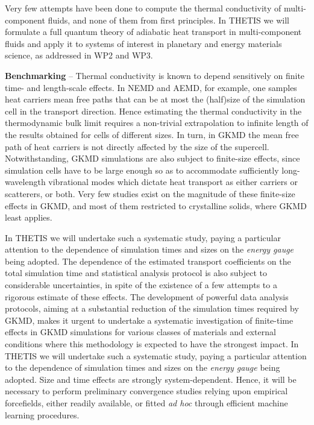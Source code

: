 Very few attempts have been done to compute the thermal conductivity of multi-component fluids,\cite{Galamba2007,Ohtori2009a,Ohtori2009b,Salanne2011,Pan2016} and none of them from first principles. In THETIS we will formulate a full quantum theory of adiabatic heat transport in multi-component fluids and apply it to systems of interest in planetary and energy materials science, as addressed in WP2 and WP3. 

\smallskip\noindent\textbf{Benchmarking} -- Thermal conductivity is known to depend sensitively on finite time- and length-scale effects. In NEMD and AEMD, for example, one samples heat carriers mean free paths that can be at most the (half)size of the simulation cell in the transport direction. Hence estimating the thermal conductivity in the thermodynamic bulk limit requires a non-trivial extrapolation to infinite length of the results obtained for cells of different sizes.\cite{sellan2010,Zaoui2016,Wang2017} In turn, in GKMD the mean free path of heat carriers is not directly affected by the size of the supercell. Notwithstanding, GKMD simulations are also subject to  finite-size effects, since simulation cells have to be large enough so as to accommodate sufficiently long-wavelength vibrational modes which dictate heat transport as either carriers or scatterers, or both. Very few studies exist on the magnitude of these finite-size effects in GKMD,\cite{sellan2010,He2011,Pereira:2013bo,Wang2017} and most of them restricted to crystalline solids, where GKMD least applies.

In THETIS we will undertake such a systematic study, paying a particular attention to the dependence of simulation times and sizes on the \emph{energy gauge} being adopted.
The dependence of the estimated transport coefficients on the total simulation time and statistical analysis protocol is also subject to considerable uncertainties, in spite of the existence of a few attempts to a rigorous estimate of these effects.\cite{Jones2012,Oliveira2017} The development of powerful data analysis protocols, aiming at a substantial reduction of the simulation times required by GKMD,\cite{Ercole2017} makes it urgent to undertake a systematic investigation of finite-time effects in GKMD simulations for various classes of materials and external conditions where this methodology is expected to have the strongest impact. In THETIS we will undertake such a systematic study, paying a particular attention to the dependence of simulation times and sizes on the \emph{energy gauge} being adopted. Size and time effects are strongly system-dependent. Hence, it will be necessary to perform preliminary convergence studies relying upon  empirical forcefields, either readily available, or fitted {\it ad hoc} through efficient machine learning procedures.\cite{Izvekov:2004ur,Behler:2007fe, Bartok:2010fj,Fritsch:2014hh}

